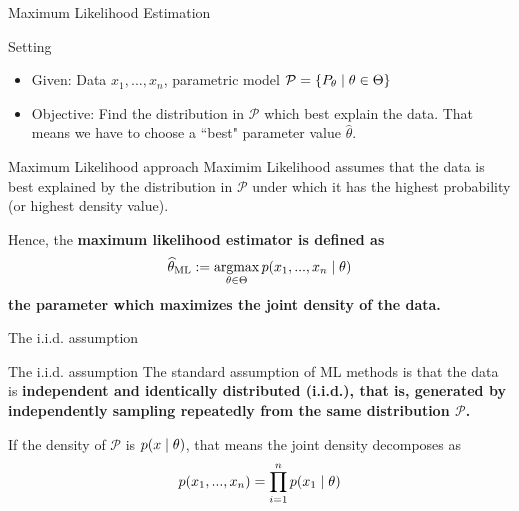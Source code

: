 \documentclass[10pt]{beamer}
\begin{document}
\begin{frame}{Maximum Likelihood Estimation}
\begin{sblock}{Setting}
\begin{itemize}
\item Given: Data $x_1, ..., x_n$, parametric model $\mathcal{P} = \{ {P_\theta \; | \; \theta \in \Theta} \}$
\item Objective: Find the distribution in $\mathcal{P}$ which best explain the data.  That means we have to choose a ``best" parameter value $\widehat{\theta}$.
\end{itemize}
\end{sblock}

\begin{sblock}{Maximum Likelihood approach}
Maximim Likelihood assumes that the data is best explained by the distribution in $\mathcal{P}$ under which it has the highest probability (or highest density value).

Hence, the \bf{maximum likelihood estimator} is defined as
\[ \widehat{\theta}_{\text{ML}} := \operatorname*{argmax}_{\theta \in \Theta} p(x_1, ..., x_n \; | \; \theta) \]
the parameter which maximizes the joint density of the data.
\end{sblock}

\end{frame}


\begin{frame}{The i.i.d. assumption}

\begin{sblock}{The i.i.d. assumption}
The standard assumption of ML methods is that the data is \bf{independent and identically distributed (i.i.d.)}, that is, generated by independently sampling repeatedly from the same distribution $\mathcal{P}$. 

If the density of $\mathcal{P}$ is $p(x \; | \; \theta)$, that means the joint density decomposes as 
\[  p(x_1, ..., x_n) = \displaystyle\prod_{i=1}^n p(x_1 \; | \; \theta) \]
\end{sblock}

\end{frame}
\end{document}
